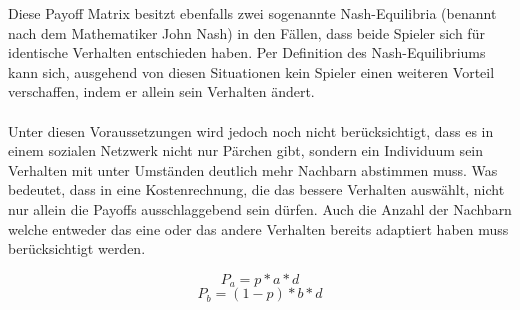\documentclass[12pt]{article}
\begin{document}
Diese Payoff Matrix besitzt ebenfalls zwei sogenannte Nash-Equilibria (benannt nach dem Mathematiker John Nash) in den Fällen, dass beide Spieler sich für identische Verhalten entschieden haben. Per Definition des Nash-Equilibriums kann sich, ausgehend von diesen Situationen kein Spieler einen weiteren Vorteil verschaffen, indem er allein sein Verhalten ändert.\\\\
Unter diesen Voraussetzungen wird jedoch noch nicht berücksichtigt, dass es in einem sozialen Netzwerk nicht nur Pärchen gibt, sondern ein Individuum sein Verhalten mit unter Umständen deutlich mehr Nachbarn abstimmen muss. Was bedeutet, dass in eine Kostenrechnung, die das bessere Verhalten auswählt, nicht nur allein die Payoffs ausschlaggebend sein dürfen. Auch die Anzahl der Nachbarn welche entweder das eine oder das andere Verhalten bereits adaptiert haben muss berücksichtigt werden.

 \begin{equation}
 \label{formel_payoffA}
 P_a = p*a*d
 \end{equation}
 \begin{equation}
 \label{formel_payoffB}
 P_b = (1-p)*b*d
 \end{equation}
 
\end{document}
